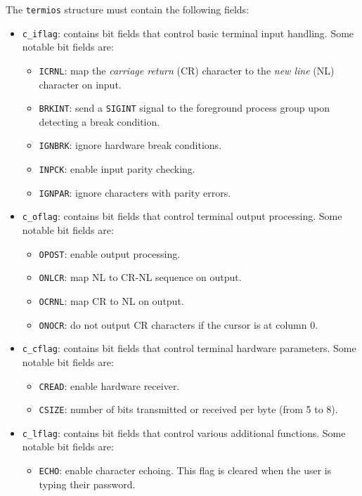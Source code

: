 \documentclass[shortabstract, manyadvisors, english, mgr]{iithesis}
\begin{document}
The \texttt{termios} structure must contain the following fields:
\begin{itemize}
\item \texttt{c\_iflag}: contains bit fields that control basic
  terminal input handling. Some notable bit fields are:
  \begin{itemize}
  \item \texttt{ICRNL}: map the \textit{carriage return} (CR) character to the
    \textit{new line} (NL) character on input.
  \item \texttt{BRKINT}: send a \texttt{SIGINT} signal to the foreground process
    group upon detecting a break condition.
  \item \texttt{IGNBRK}: ignore hardware break conditions.
  \item \texttt{INPCK}: enable input parity checking.
  \item \texttt{IGNPAR}: ignore characters with parity errors.
  \end{itemize}
\item \texttt{c\_oflag}: contains bit fields that control terminal
  output processing. Some notable bit fields are:
  \begin{itemize}
  \item \texttt{OPOST}: enable output processing.
  \item \texttt{ONLCR}: map NL to CR-NL sequence on output.
  \item \texttt{OCRNL}: map CR to NL on output.
  \item \texttt{ONOCR}: do not output CR characters if the cursor is at column
    0.
  \end{itemize}
\item \texttt{c\_cflag}: contains bit fields that control terminal
  hardware parameters. Some notable bit fields are:
  \begin{itemize}
  \item \texttt{CREAD}: enable hardware receiver.
  \item \texttt{CSIZE}: number of bits transmitted or received per byte (from 5
    to 8).
  \end{itemize}
\item \texttt{c\_lflag}: contains bit fields that control various additional
  functions. Some notable bit fields are:
  \begin{itemize}
  \item \texttt{ECHO}: enable character echoing. This flag is cleared when the
    user is typing their password.


\end{itemize}
\end{itemize}
\end{document}
